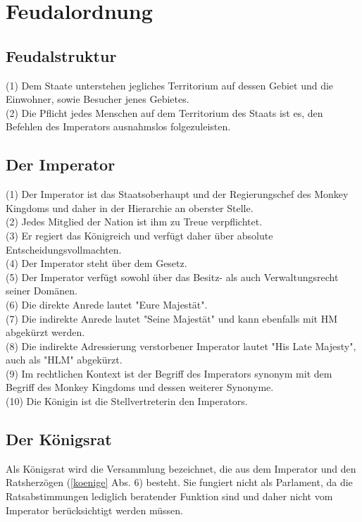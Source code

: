 \documentclass{article}
\begin{document}
\section{Feudalordnung}
\subsection{Feudalstruktur}
(1) Dem Staate unterstehen jegliches Territorium auf dessen Gebiet und die Einwohner, sowie Besucher jenes Gebietes.\\
(2) Die Pflicht jedes Menschen auf dem Territorium des Staats ist es, den Befehlen des Imperators ausnahmslos folgezuleisten.\\

\subsection{Der Imperator}
(1) Der Imperator ist das Staatsoberhaupt und der Regierungschef des Monkey Kingdoms und daher in der Hierarchie an oberster Stelle. \\ 
(2) Jedes Mitglied der Nation ist ihm zu Treue verpflichtet.\\
(3) Er regiert das Königreich und verfügt daher über absolute Entscheidungsvollmachten.\\
(4) Der Imperator steht über dem Gesetz.\\
(5) Der Imperator verfügt sowohl über das Besitz- als auch Verwaltungsrecht seiner Domänen.\\
(6) Die direkte Anrede lautet "Eure Majestät".\\
(7) Die indirekte Anrede lautet "Seine Majestät" und kann ebenfalls mit HM abgekürzt werden.\\
(8) Die indirekte Adressierung verstorbener Imperator lautet "His Late Majesty", auch als "HLM" abgekürzt.\\
(9) Im rechtlichen Kontext ist der Begriff des Imperators synonym mit dem Begriff des Monkey Kingdoms und dessen weiterer Synonyme.\\
(10) Die Königin ist die Stellvertreterin den Imperators.

\subsection{Der Königsrat}
Als Königsrat wird die Versammlung bezeichnet, die aus dem Imperator und den Ratsherzögen (\ref{koenige} Abs. 6) besteht. Sie fungiert nicht als Parlament, da die Ratsabstimmungen lediglich beratender Funktion sind und daher nicht vom Imperator berücksichtigt werden müssen.
\end{document}
